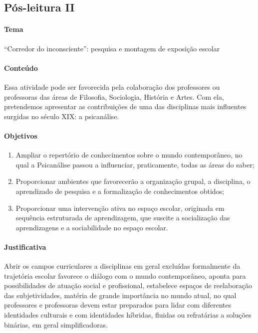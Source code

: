 \documentclass[12pt]{extarticle}
\begin{document}
\subsection{Pós-leitura II}

\paragraph{Tema} ``Corredor do inconsciente'': pesquisa e montagem de
exposição escolar


\paragraph{Conteúdo}
Essa atividade pode ser favorecida pela colaboração dos professores ou
professoras das áreas de Filosofia, Sociologia, História e Artes. Com
ela, pretendemos apresentar as contribuições de uma das disciplinas mais
influentes surgidas no século XIX: a psicanálise.

\paragraph{Objetivos}
\begin{enumerate}
\item
Ampliar o repertório de conhecimentos sobre o mundo contemporâneo, no
qual a Psicanálise passou a influenciar, praticamente, todas as áreas do
saber; 

\item
Proporcionar ambientes que favorecerão a organização grupal, a
disciplina, o aprendizado de pesquisa e a formalização de conhecimentos
obtidos; 

\item
Proporcionar uma intervenção ativa no espaço escolar,
originada em sequência estruturada de aprendizagem, que suscite a
socialização das aprendizagens e a sociabilidade no espaço escolar.
\end{enumerate}

\paragraph{Justificativa}
Abrir os campos curriculares a disciplinas em geral excluídas
formalmente da trajetória escolar favorece o diálogo com o mundo
contemporâneo, aponta para possibilidades de atuação social e
profissional, estabelece espaços de reelaboração das subjetividades,
matéria de grande importância no mundo atual, no qual professores e
professoras devem estar preparados para lidar com diferentes identidades
culturais e com identidades híbridas, fluidas ou refratárias a soluções
binárias, em geral simplificadoras.
\end{document}
